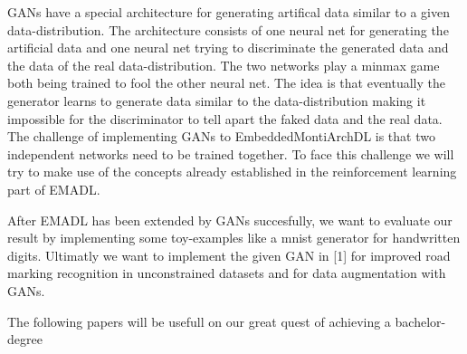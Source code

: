 \documentclass[12pt, a4paper]{article}
\begin{document}
\bigskip

GANs have a special architecture for generating artifical data similar to a given data-distribution.
The architecture consists of one neural net for generating the artificial data and one neural net
trying to discriminate the generated data and the data of the real data-distribution. The two
networks play a minmax game both being trained to fool the other neural net. The idea is that
eventually the generator learns to generate data similar to the data-distribution making it
impossible for the discriminator to tell apart the faked data and the real data. The challenge of
implementing GANs to EmbeddedMontiArchDL is that two independent networks need to be trained
together. To face this challenge we will try to make use of the concepts already established in the
reinforcement learning part of EMADL.

\smallskip

After EMADL has been extended by GANs succesfully, we want to evaluate our result by implementing
some toy-examples like a mnist generator for handwritten digits. Ultimatly we want to
implement the given GAN in [1] for improved road marking recognition in unconstrained datasets and
for data augmentation with GANs.

\bigskip

The following papers will be usefull on our great quest of achieving a bachelor-degree


{}
\end{document}
